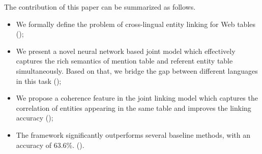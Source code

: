 The contribution of this paper can be summarized as follows.
\begin{itemize}
\itemsep0em
\item We formally define the problem of cross-lingual entity linking for Web tables ();
\item We present a novel neural network based joint model which effectively captures the rich semantics of mention table and referent entity table simultaneously. Based on that, we bridge the gap between different languages in this task ();
\item We propose a coherence feature in the joint linking model which captures the correlation of entities appearing in the same table and improves the linking accuracy ();
\item The framework significantly outperforms
several baseline methods, with an accuracy of 63.6\%. ().
\end{itemize}

